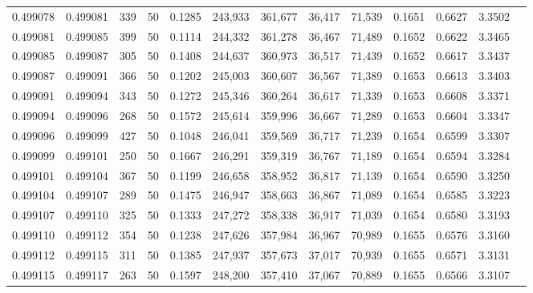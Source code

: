 \begin{tabular}{rrrrrrrrrrrrr}
0.499078 & 0.499081 & 339 &  50 &                                     0.1285 & 243,933 & 361,677 &  36,417 &  71,539 & 0.1651 & 0.6627 & 3.3502 \\
0.499081 & 0.499085 & 399 &  50 &                                     0.1114 & 244,332 & 361,278 &  36,467 &  71,489 & 0.1652 & 0.6622 & 3.3465 \\
0.499085 & 0.499087 & 305 &  50 &                                     0.1408 & 244,637 & 360,973 &  36,517 &  71,439 & 0.1652 & 0.6617 & 3.3437 \\
0.499087 & 0.499091 & 366 &  50 &                                     0.1202 & 245,003 & 360,607 &  36,567 &  71,389 & 0.1653 & 0.6613 & 3.3403 \\
0.499091 & 0.499094 & 343 &  50 &                                     0.1272 & 245,346 & 360,264 &  36,617 &  71,339 & 0.1653 & 0.6608 & 3.3371 \\
0.499094 & 0.499096 & 268 &  50 &                                     0.1572 & 245,614 & 359,996 &  36,667 &  71,289 & 0.1653 & 0.6604 & 3.3347 \\
0.499096 & 0.499099 & 427 &  50 &                                     0.1048 & 246,041 & 359,569 &  36,717 &  71,239 & 0.1654 & 0.6599 & 3.3307 \\
0.499099 & 0.499101 & 250 &  50 &                                     0.1667 & 246,291 & 359,319 &  36,767 &  71,189 & 0.1654 & 0.6594 & 3.3284 \\
0.499101 & 0.499104 & 367 &  50 &                                     0.1199 & 246,658 & 358,952 &  36,817 &  71,139 & 0.1654 & 0.6590 & 3.3250 \\
0.499104 & 0.499107 & 289 &  50 &                                     0.1475 & 246,947 & 358,663 &  36,867 &  71,089 & 0.1654 & 0.6585 & 3.3223 \\
0.499107 & 0.499110 & 325 &  50 &                                     0.1333 & 247,272 & 358,338 &  36,917 &  71,039 & 0.1654 & 0.6580 & 3.3193 \\
0.499110 & 0.499112 & 354 &  50 &                                     0.1238 & 247,626 & 357,984 &  36,967 &  70,989 & 0.1655 & 0.6576 & 3.3160 \\
0.499112 & 0.499115 & 311 &  50 &                                     0.1385 & 247,937 & 357,673 &  37,017 &  70,939 & 0.1655 & 0.6571 & 3.3131 \\
0.499115 & 0.499117 & 263 &  50 &                                     0.1597 & 248,200 & 357,410 &  37,067 &  70,889 & 0.1655 & 0.6566 & 3.3107 \\

\end{tabular}
